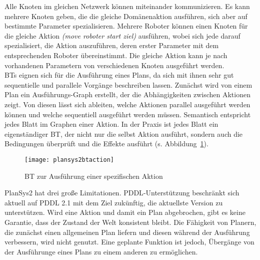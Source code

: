 Alle Knoten im gleichen Netzwerk können miteinander kommunizieren.
Es kann mehrere Knoten geben, die die gleiche Domänenaktion ausführen, sich aber auf bestimmte Parameter spezialisieren.
Mehrere Roboter können einen Knoten für die gleiche Aktion \emph{(move roboter start ziel)} ausführen, wobei sich jede darauf spezialisiert, die Aktion auszuführen, deren erster Parameter mit dem entsprechenden Roboter übereinstimmt.
Die gleiche Aktion kann je nach vorhandenen Parametern von verschiedenen Knoten ausgeführt werden.\\
\acp{BT} eignen sich für die Ausführung eines Plans, da sich mit ihnen sehr gut sequentielle und parallele Vorgänge beschreiben lassen.
Zunächst wird von einem Plan ein Ausführungs-Graph erstellt, der die Abhängigkeiten zwischen Aktionen zeigt.
Von diesen lässt sich ableiten, welche Aktionen parallel ausgeführt werden können und welche sequentiell ausgeführt werden müssen.
Semantisch entspricht jedes Blatt im Graphen einer Aktion.
In der Praxis ist jedes Blatt ein eigenständiger \ac{BT}, der nicht nur die selbst Aktion ausführt, sondern auch die Bedingungen überprüft und die Effekte ausführt (s. Abbildung~\ref{fig:plansysbtaction}).\\
\begin{figure}
    \centering
    \texttt{[image: plansys2btaction]}
    \caption{\acs{BT} zur Ausführung einer spezifischen Aktion~\cite{plansys}}
    \label{fig:plansysbtaction}
    \end{figure}
\ac{PlanSys2} hat drei große Limitationen.
\ac{PDDL}-Unterstützung beschränkt sich aktuell auf \ac{PDDL} 2.1 mit dem Ziel zukünftig, die aktuellste Version zu unterstützen.
Wird eine Aktion und damit ein Plan abgebrochen, gibt es keine Garantie, dass der Zustand der Welt konsistent bleibt.
Die Fähigkeit von Planern, die zunächst einen allgemeinen Plan liefern und diesen während der Ausführung verbessern, wird nicht genutzt.
Eine geplante Funktion ist jedoch, Übergänge von der Ausführunge eines Plans zu einem anderen zu ermöglichen.